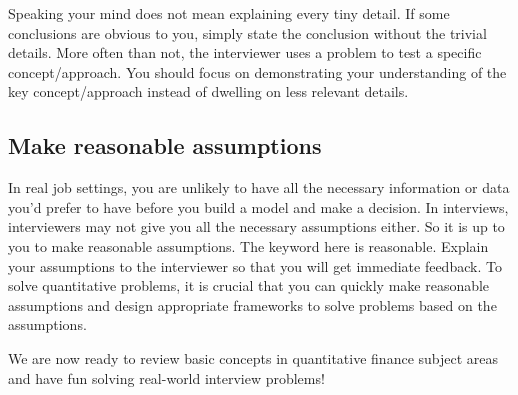 Speaking your mind does not mean explaining every tiny detail. If some conclusions are
obvious to you, simply state the conclusion without the trivial details. More often than
not, the interviewer uses a problem to test a specific concept/approach. You should focus
on demonstrating your understanding of the key concept/approach instead of dwelling
on less relevant details.

\subsection{Make reasonable assumptions}

In real job settings, you are unlikely to have all the necessary information or data you'd
prefer to have before you build a model and make a decision. In interviews,
interviewers may not give you all the necessary assumptions either. So it is up to you to
make reasonable assumptions. The keyword here is reasonable. Explain your
assumptions to the interviewer so that you will get immediate feedback. To solve
quantitative problems, it is crucial that you can quickly make reasonable assumptions
and design appropriate frameworks to solve problems based on the assumptions.

We are now ready to review basic concepts in quantitative finance subject areas and
have fun solving real-world interview problems!
